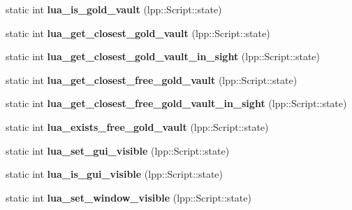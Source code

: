 \begin{DoxyCompactItemize}
\item 
static int {\bfseries lua\+\_\+is\+\_\+gold\+\_\+vault} (lpp\+::\+Script\+::state)\hypertarget{class_lua_interface_a4e348f1fdf2ad0e708b0a833089c16ae}{}\label{class_lua_interface_a4e348f1fdf2ad0e708b0a833089c16ae}

\item 
static int {\bfseries lua\+\_\+get\+\_\+closest\+\_\+gold\+\_\+vault} (lpp\+::\+Script\+::state)\hypertarget{class_lua_interface_a7c5c59a657122c3fa928516f64f74002}{}\label{class_lua_interface_a7c5c59a657122c3fa928516f64f74002}

\item 
static int {\bfseries lua\+\_\+get\+\_\+closest\+\_\+gold\+\_\+vault\+\_\+in\+\_\+sight} (lpp\+::\+Script\+::state)\hypertarget{class_lua_interface_a2c7d31ed417832f59e077d9a4d2dcd03}{}\label{class_lua_interface_a2c7d31ed417832f59e077d9a4d2dcd03}

\item 
static int {\bfseries lua\+\_\+get\+\_\+closest\+\_\+free\+\_\+gold\+\_\+vault} (lpp\+::\+Script\+::state)\hypertarget{class_lua_interface_acb73fceca675dd244a6595f6a6e60477}{}\label{class_lua_interface_acb73fceca675dd244a6595f6a6e60477}

\item 
static int {\bfseries lua\+\_\+get\+\_\+closest\+\_\+free\+\_\+gold\+\_\+vault\+\_\+in\+\_\+sight} (lpp\+::\+Script\+::state)\hypertarget{class_lua_interface_abe1d9e9e052d5a20c73a7f101a38e67d}{}\label{class_lua_interface_abe1d9e9e052d5a20c73a7f101a38e67d}

\item 
static int {\bfseries lua\+\_\+exists\+\_\+free\+\_\+gold\+\_\+vault} (lpp\+::\+Script\+::state)\hypertarget{class_lua_interface_aa37ce101e388eac88c973c5f3a9c95a8}{}\label{class_lua_interface_aa37ce101e388eac88c973c5f3a9c95a8}

\item 
static int {\bfseries lua\+\_\+set\+\_\+gui\+\_\+visible} (lpp\+::\+Script\+::state)\hypertarget{class_lua_interface_aa939c0fc34ea8e2f5c74265cbf65bdc3}{}\label{class_lua_interface_aa939c0fc34ea8e2f5c74265cbf65bdc3}

\item 
static int {\bfseries lua\+\_\+is\+\_\+gui\+\_\+visible} (lpp\+::\+Script\+::state)\hypertarget{class_lua_interface_a9d3db96fde3d612babb415fed8a90d4a}{}\label{class_lua_interface_a9d3db96fde3d612babb415fed8a90d4a}

\item 
static int {\bfseries lua\+\_\+set\+\_\+window\+\_\+visible} (lpp\+::\+Script\+::state)\hypertarget{class_lua_interface_ab36481229d27b9517f6de03e87477ba2}{}\label{class_lua_interface_ab36481229d27b9517f6de03e87477ba2}


\end{DoxyCompactItemize}
